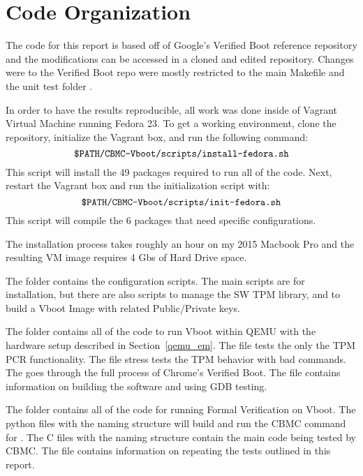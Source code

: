 \chapter{Code Organization}

The code for this report is based off of Google's Verified Boot reference repository\cite{vboot-codebase} and the modifications can be accessed in a cloned and edited repository\cite{my-repo}.
Changes were to the Verified Boot repo were mostly restricted to the main Makefile and the unit test folder .

In order to have the results reproducible, all work was done inside of Vagrant Virtual Machine running Fedora 23. 
To get a working environment, clone the repository, initialize the Vagrant box, and run the following command:
\begin{equation}
    \texttt{\$PATH/CBMC-Vboot/scripts/install-fedora.sh} 
\end{equation}
This script will install the 49 packages required to run all of the code. 
Next, restart the Vagrant box and run the initialization script with:
\begin{equation}
    \texttt{\$PATH/CBMC-Vboot/scripts/init-fedora.sh} 
\end{equation}
This script will compile the 6 packages that need specific configurations.

The installation process takes roughly an hour on my 2015 Macbook Pro and the resulting VM image requires 4 Gbs of Hard Drive space. 

The  folder contains the configuration scripts.
The main scripts are for installation, but there are also scripts to manage the SW TPM library, and to build a Vboot Image with related Public/Private keys.

The  folder contains all of the code to run Vboot within QEMU with the hardware setup described in Section~\ref{qemu_em}.
The  file tests the only the TPM PCR functionality.
The  file stress tests the TPM behavior with bad commands.
The  goes through the full process of Chrome's Verified Boot.
The  file contains information on building the software and using GDB testing.

The  folder contains all of the code for running Formal Verification on Vboot.
The python files with the naming structure  will build and run the CBMC command for .
The C files with the naming structure  contain the main code being tested by CBMC\@.
The  file contains information on repeating the tests outlined in this report.


